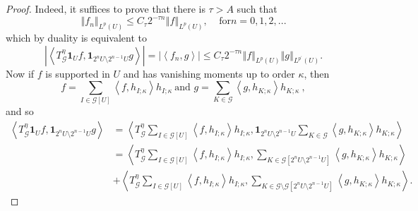 \documentclass{amsart}%
\theoremstyle{plain}
\numberwithin{equation}{section}
\begin{document}
\begin{proof}
Indeed, it suffices to prove that there is $\tau>A$ such that
\[
\left\Vert f_{n}\right\Vert _{L^{p}\left(  U\right)  }\leq C_{\tau}2^{-\tau
n}\left\Vert f\right\Vert _{L^{p}\left(  U\right)  },\ \ \ \ \ \text{for
}n=0,1,2,...
\]
which by duality is equivalent to
\[
\left\vert \left\langle T_{\mathcal{G}}^{\eta}\mathbf{1}_{U}f,\mathbf{1}%
_{2^{n}U\setminus2^{n-1}U}g\right\rangle \right\vert =\left\vert \left\langle
f_{n},g\right\rangle \right\vert \leq C_{\tau}2^{-\tau n}\left\Vert
f\right\Vert _{L^{p}\left(  U\right)  }\left\Vert g\right\Vert _{L^{p^{\prime
}}\left(  U\right)  }.
\]
Now if $f$ is supported in $U$ and has vanishing moments up to order $\kappa$,
then%
\[
f=\sum_{I\in\mathcal{G}\left[  U\right]  }\left\langle f,h_{I;\kappa
}\right\rangle h_{I;\kappa}\ \text{and }g=\sum_{K\in\mathcal{G}}\left\langle
g,h_{K;\kappa}\right\rangle h_{K;\kappa}\ ,
\]
and so%
\begin{align}
\left\langle T_{\mathcal{G}}^{\eta}\mathbf{1}_{U}f,\mathbf{1}_{2^{n}%
U\setminus2^{n-1}U}g\right\rangle  & =\left\langle T_{\mathcal{G}}^{\eta}%
\sum_{I\in\mathcal{G}\left[  U\right]  }\left\langle f,h_{I;\kappa
}\right\rangle h_{I;\kappa},\mathbf{1}_{2^{n}U\setminus2^{n-1}U}\sum
_{K\in\mathcal{G}}\left\langle g,h_{K;\kappa}\right\rangle h_{K;\kappa
}\right\rangle \label{<Tf,g>}\\
& =\left\langle T_{\mathcal{G}}^{\eta}\sum_{I\in\mathcal{G}\left[  U\right]
}\left\langle f,h_{I;\kappa}\right\rangle h_{I;\kappa},\sum_{K\in
\mathcal{G}\left[  2^{n}U\setminus2^{n-1}U\right]  }\left\langle
g,h_{K;\kappa}\right\rangle h_{K;\kappa}\right\rangle \nonumber\\
& +\left\langle T_{\mathcal{G}}^{\eta}\sum_{I\in\mathcal{G}\left[  U\right]
}\left\langle f,h_{I;\kappa}\right\rangle h_{I;\kappa},\sum_{K\in
\mathcal{G}\setminus\mathcal{G}\left[  2^{n}U\setminus2^{n-1}U\right]
}\left\langle g,h_{K;\kappa}\right\rangle h_{K;\kappa}\right\rangle .\nonumber
\end{align}



\end{proof}
\end{document}
